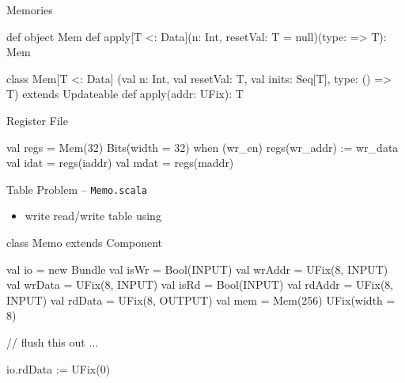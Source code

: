 \documentclass[xcolor=pdflatex,dvipsnames,table]{beamer}
\begin{document}
\begin{frame}[fragile]{Memories}

\begin{scala}
def object Mem {
  def apply[T <: Data](n: Int, resetVal: T = null)(type: => T): Mem
}

class Mem[T <: Data]
    (val n: Int, val resetVal: T, val inits: Seq[T], type: () => T) 
      extends Updateable {
  def apply(addr: UFix): T
}
\end{scala}

\end{frame}

\begin{frame}[fragile]{Register File}

\begin{scala}
val regs = Mem(32){ Bits(width = 32) }
when (wr_en) {
  regs(wr_addr) := wr_data
}
val idat = regs(iaddr)
val mdat = regs(maddr)
\end{scala}

\end{frame}

% 
% 

\begin{frame}[fragile]{Table Problem -- \tt Memo.scala}
\begin{itemize}
\item write read/write table using 
\end{itemize}
\begin{scala}
class Memo extends Component {
  val io = new Bundle {
    val isWr    = Bool(INPUT)
    val wrAddr  = UFix(8, INPUT)
    val wrData  = UFix(8, INPUT)
    val isRd    = Bool(INPUT)
    val rdAddr  = UFix(8, INPUT)
    val rdData  = UFix(8, OUTPUT)
  }
  val mem = Mem(256){ UFix(width = 8) }

  // flush this out ...

  io.rdData := UFix(0)
}
\end{scala}
\end{frame}
\end{document}
